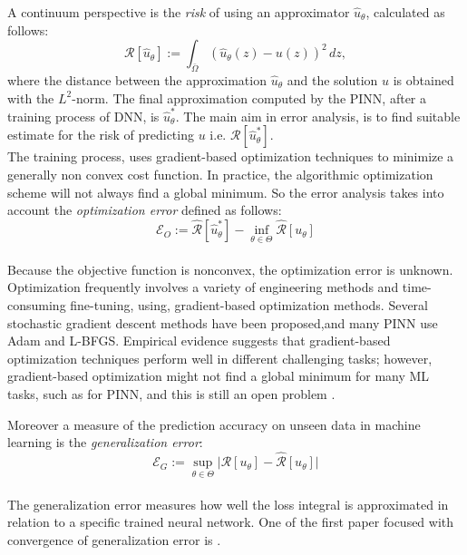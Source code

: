 \documentclass[pdflatex,sn-basic]{sn-jnl}%
\theoremstyle{thmstyleone}%
\theoremstyle{thmstyletwo}%
\theoremstyle{thmstylethree}%
\begin{document}
A continuum perspective is the \emph{risk} of using an approximator  $\hat{u}_\theta$, calculated as follows: 
\begin{equation} \label{eq:risk}
\mathcal{R}[\hat{u}_\theta] := \int_{\bar{\Omega}} (\hat{u}_\theta(z) - u(z))^2 \, dz,
\end{equation}
where the distance between the approximation $\hat{u}_\theta$ and the solution $u$ is obtained with the $L^2$-norm.
%
The final approximation computed by the PINN, after a training process of DNN, is $\hat{u}_\theta^*$. 
The main aim in error analysis, is to find suitable estimate for the risk of predicting $u$ i.e. $\mathcal{R}[\hat{u}_\theta^*]$.
\\
The training process, uses gradient-based optimization techniques to minimize a generally non convex cost function. 
In practice, the algorithmic optimization scheme will not always find a global minimum. 
So the error analysis takes into account the \emph{optimization error} defined as follows:
\begin{equation*}
\mathcal{E}_O :=
\widehat{\mathcal{R}}[\hat{u}_\theta^*] - \inf_{\theta \in \Theta} \widehat{\mathcal{R}}[u_\theta]
\end{equation*}
\\
Because the objective function is nonconvex, the optimization error is unknown.
Optimization frequently involves a variety of engineering methods and time-consuming fine-tuning, using, gradient-based optimization methods.
Several stochastic gradient descent methods have been proposed,and
many PINN use Adam and L-BFGS.
Empirical evidence suggests that gradient-based optimization techniques perform well in different challenging tasks; however, gradient-based optimization might not find a global minimum for many ML tasks, such as for PINN, and this is still an open problem \citep{Shi2020_ConvergencePhysicsInformed_DarSDK}. 




Moreover a measure of the prediction accuracy on unseen data in machine learning is the 
\emph{generalization error}:
\begin{equation*}
\mathcal{E}_G :=
\sup_{\theta \in \Theta} 
\lvert \mathcal{R}[u_\theta]  -\widehat{\mathcal{R}}[u_\theta] \rvert 
\end{equation*}
\\
The generalization error measures how well the loss integral is approximated in relation to a specific trained neural network. 
One of the first  paper focused with convergence of generalization error is \cite{Shi2020_ConvergencePhysicsInformed_DarSDK}. 
\end{document}
